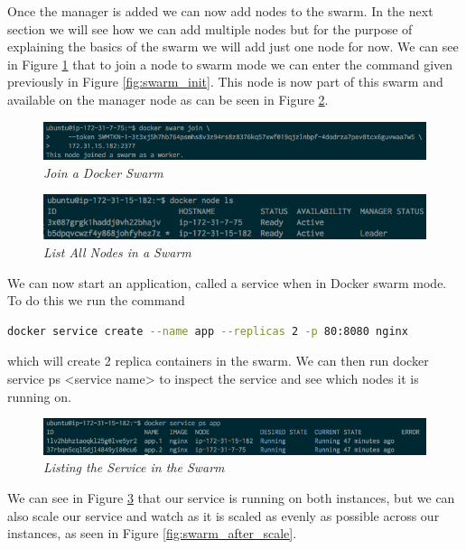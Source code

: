 \documentclass{article}
\begin{document}
Once the manager is added we can now add nodes to the swarm. In the next section we will see how we can add multiple nodes but for the purpose of explaining the basics of the swarm we will add just one node for now. We can see in Figure \ref{fig:swarm_join} that to join a node to swarm mode we can enter the command given previously in Figure \ref{fig:swarm_init}. This node is now part of this swarm and available on the manager node as can be seen in Figure \ref{fig:swarm_ls}.

\begin{figure}[!h]
\centering
\includegraphics*[width=\textwidth]{components/images/swarm_join}
\caption{\em Join a Docker Swarm}
\label{fig:swarm_join}
\end{figure}

\begin{figure}[!h]
\centering
\includegraphics*[width=\textwidth]{components/images/swarm_ls}
\caption{\em List All Nodes in a Swarm}
\label{fig:swarm_ls}
\end{figure}

We can now start an application, called a service when in Docker swarm mode. To do this we run the command

\begin{lstlisting}[language=bash]
  docker service create --name app --replicas 2 -p 80:8080 nginx
\end{lstlisting}

which will create 2 replica containers in the swarm. We can then run docker service ps <service name> to inspect the service and see which nodes it is running on.

\begin{figure}[!h]
\centering
\includegraphics*[width=\textwidth]{components/images/swarm_ps}
\caption{\em Listing the Service in the Swarm}
\label{fig:swarm_ps}
\end{figure}

We can see in Figure \ref{fig:swarm_ps} that our service is running on both instances, but we can also scale our service and watch as it is scaled as evenly as possible across our instances, as seen in Figure \ref{fig:swarm_after_scale}.
\end{document}
